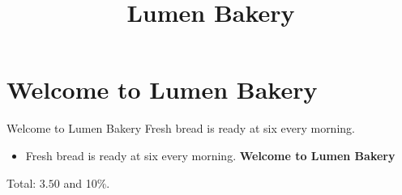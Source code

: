 \documentclass{article}
\title{Lumen Bakery}
\begin{document}
\maketitle
\section{Welcome to Lumen Bakery}
Welcome to Lumen Bakery
Fresh bread is ready at six every morning.

\begin{itemize}
\item Fresh bread is ready at six every morning. \textbf{Welcome to Lumen Bakery}
\end{itemize}
Total: $3.50$ and 10\%.
\end{document}
